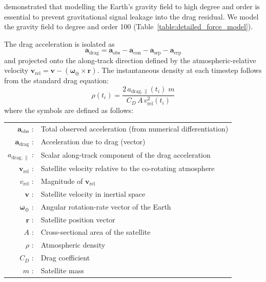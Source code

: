 \documentclass[draft]{agujournal2019}
\begin{document}
demonstrated that modelling the Earth's gravity field to high degree and order
is essential to prevent gravitational signal leakage into the drag residual.
We model the gravity field to degree and order 100
(Table~\ref{table:detailed_force_model}).

The drag acceleration is isolated as
\begin{equation}
\label{drag_eqn}
\mathbf{a}_{\text{drag}}
= \mathbf{a}_{\text{obs}}
- \mathbf{a}_{\text{con}}
- \mathbf{a}_{\text{srp}}
- \mathbf{a}_{\text{erp}}
\end{equation}
and projected onto the along-track direction defined by the
atmospheric-relative velocity
$\mathbf{v}_{\text{rel}} = \mathbf{v} -
(\boldsymbol{\omega}_{\oplus} \times \mathbf{r})$.
The instantaneous density at each timestep follows from the standard drag
equation:
\begin{equation}
\label{rho_eqn}
\rho(t_i) = \frac{2\,a_{\text{drag},\parallel}(t_i)\; m}
                  {C_D \, A \, v_{\text{rel}}^2(t_i)}
\end{equation}
where the symbols are defined as follows:

\begin{tabular}{r l}
$\mathbf{a}_{\text{obs}}$              : & Total observed acceleration (from numerical differentiation) \\
$\mathbf{a}_{\text{drag}}$            : & Acceleration due to drag (vector) \\
$a_{\text{drag},\parallel}$           : & Scalar along-track component of the drag acceleration \\
$\mathbf{v}_{\text{rel}}$             : & Satellite velocity relative to the co-rotating atmosphere \\
$v_{\text{rel}}$                       : & Magnitude of $\mathbf{v}_{\text{rel}}$ \\
$\mathbf{v}$                          : & Satellite velocity in inertial space \\
$\boldsymbol{\omega}_{\oplus}$        : & Angular rotation-rate vector of the Earth \\
$\mathbf{r}$                          : & Satellite position vector \\
$A$                                    : & Cross-sectional area of the satellite \\
$\rho$                                 : & Atmospheric density \\
$C_{D}$                                : & Drag coefficient \\
$m$                                    : & Satellite mass \\
\end{tabular}
\end{document}
